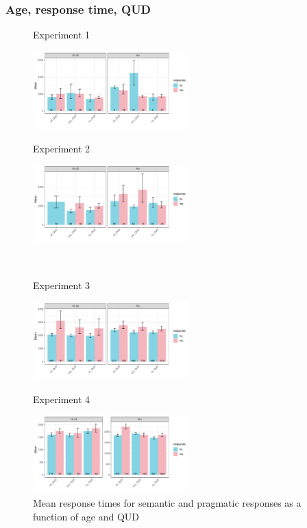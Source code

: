 \documentclass[12pt]{article}
\begin{document}
\pagebreak
\subsubsection*{Age, response time, QUD}
\begin{figure}[!h] 
    \centering
    \begin{minipage}{.5\textwidth}
        \caption*{Experiment 1}
        \includegraphics[height=3cm]{img/exp1_age_time.pdf}
    \end{minipage}%
    \begin{minipage}{.5\textwidth}
        \caption*{Experiment 2}
        \includegraphics[height=3cm]{img/exp2_age_time.pdf}
    \end{minipage}%
    \\
    \begin{minipage}{.5\textwidth}
        \caption*{Experiment 3}
        \includegraphics[height=3cm]{img/exp3_age_time.pdf}
    \end{minipage}%
    \begin{minipage}{.5\textwidth}
        \caption*{Experiment 4}
        \includegraphics[height=3cm]{img/exp4_age_time.pdf}
    \end{minipage}%
    \caption{Mean response times for semantic and pragmatic responses as a function of age and QUD}
\end{figure}
\end{document}
